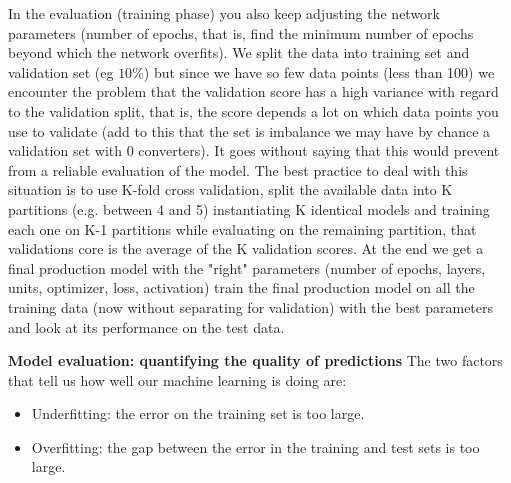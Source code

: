 \documentclass[11pt]{article}
\begin{document}
In the evaluation (training phase) you also keep adjusting the network parameters (number of epochs, that is, find the minimum number of epochs beyond which the network overfits). We split the data into training set and validation set (eg $10\%$) but since we have so few data points (less than 100) we encounter the problem that the validation score has a high variance with regard to the validation split, that is, the score depends a lot on which data points you use to validate (add to this that the set is imbalance we may have by chance a validation set with 0 converters). It goes without saying that this would prevent from a reliable evaluation of the model. 
The best practice to deal with this situation is to use K-fold cross validation, split the available data into K partitions (e.g. between 4 and 5) instantiating K identical models and training each one on K-1 partitions while evaluating on the remaining partition, that validations core is the average of the K validation scores.
At the end we get a final production model with the "right" parameters (number of epochs, layers, units, optimizer, loss, activation) train the final production model on all the training data (now without separating for validation) with the best parameters and look at its performance on the test data.












\textbf{Model evaluation: quantifying the quality of predictions }
The two factors that tell us how well our machine learning is doing are:
\begin{itemize}
\item Underfitting: the error on the training set is too large.
\item Overfitting: the gap between the error in the training and test sets is too large. 
\end{itemize}
\end{document}
